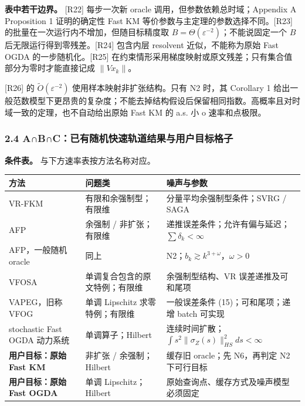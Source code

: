 \documentclass[
  chinese,
  10pt,
  a4paper,
]{article}
\newcounter{none} %
\begin{document}
\textbf{表中若干边界。} {[}R22{]} 每步一次新 oracle
调用，但参数依赖总时域；Appendix A Proposition 1 证明的确定性 Fast KM
等价参数与主定理的参数选择不同。{[}R23{]}
的批量在一次运行内不增加，但随目标精度取
\(B=\Theta(\varepsilon^{-2})\)；不能说固定一个 \(B\)
后无限运行得到零残差。{[}R24{]} 包含内层 resolvent 近似，不能称为原始
Fast OGDA 的一步随机化。{[}R25{]}
在约束情形采用梯度映射或原文残差；只有集合值部分为零时才能直接记成
\(\lVert Vx_k\rVert\)。

{[}R26{]} 的 \(\widetilde O(\varepsilon^{-2})\)
使用样本映射非扩张结构。只有 N2 时，其 Corollary 1
给出一般范数模型下更昂贵的复杂度；不能去掉结构假设后保留相同指数。高概率且对时域一致的定理，也不自动给出原始
Fast KM 的 a.s. 小 o 速率和点极限。

\subsubsection{2.4
A∩B∩C：已有随机快速轨道结果与用户目标格子}\label{abcux5df2ux6709ux968fux673aux5febux901fux8f68ux9053ux7ed3ux679cux4e0eux7528ux6237ux76eeux6807ux683cux5b50}

\textbf{条件表。} 与下方速率表按方法名称对应。

{\def\LTcaptype{none} %
\begin{longtable}[]{@{}
  >{\raggedright\arraybackslash}p{}
  >{\raggedright\arraybackslash}p{}
  >{\raggedright\arraybackslash}p{}@{}}
\toprule\noalign{}
\begin{minipage}[b]{\linewidth}\raggedright
方法
\end{minipage} & \begin{minipage}[b]{\linewidth}\raggedright
问题类
\end{minipage} & \begin{minipage}[b]{\linewidth}\raggedright
噪声与参数
\end{minipage} \\
\midrule\noalign{}
\endhead
\bottomrule\noalign{}
\endlastfoot
VR-FKM & 有限和余强制型；有限维 & 分量平均余强制型条件；SVRG / SAGA \\
AFP & 余强制 / 非扩张；有限维 &
递推误差条件；允许有偏与延迟；\(\sum\delta_k<\infty\) \\
AFP，一般随机 oracle & 同上 &
N2；\(b_k\gtrsim k^{3+\omega}\)，\(\omega>0\) \\
VFOSA & 单调复合包含的原文特例；有限维 & 余强制型结构、VR
误差递推及可和尾项 \\
VAPEG，旧称 VFOG & 单调 Lipschitz 求零特例；有限维 & 一般误差条件
(15)；可和尾项；递增 batch 可实现 \\
stochastic Fast OGDA 动力系统 & 单调算子；Hilbert &
连续时间扩散；\(\int s^2\lVert\sigma_Z(s)\rVert_{HS}^2ds<\infty\) \\
\textbf{用户目标：原始 Fast KM} & 非扩张 / 余强制；Hilbert & 缓存旧
oracle；先 N6，再判定 N2 下可行目标 \\
\textbf{用户目标：原始 Fast OGDA} & 单调 Lipschitz；Hilbert &
原始查询点、缓存方式及噪声模型必须固定 \\
\end{longtable}
}
\end{document}
